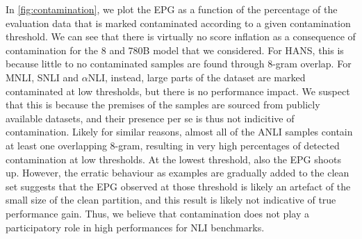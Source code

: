 
In \cref{fig:contamination}, we plot the EPG as a function of the percentage of the evaluation data that is marked contaminated according to a given contamination threshold.
We can see that there is virtually no score inflation as a consequence of contamination for the 8 and 780B model that we considered.
For HANS, this is because little to no contaminated samples are found through 8-gram overlap.
For MNLI, SNLI and $\alpha$NLI, instead, large parts of the dataset are marked contaminated at low thresholds, but there is no performance impact.
We suspect that this is because the premises of the samples are sourced from publicly available datasets, and their presence per se is thus not indicitive of contamination.
Likely for similar reasons, almost all of the ANLI samples contain at least one overlapping 8-gram, resulting in very high percentages of detected contamination at low thresholds.
At the lowest threshold, also the EPG shoots up.
However, the erratic behaviour as examples are gradually added to the clean set suggests that the EPG observed at those threshold is likely an artefact of the small size of the clean partition, and this result is likely not indicative of true performance gain.
% 
Thus, we believe that contamination does not play a participatory role in high performances for NLI benchmarks. %

